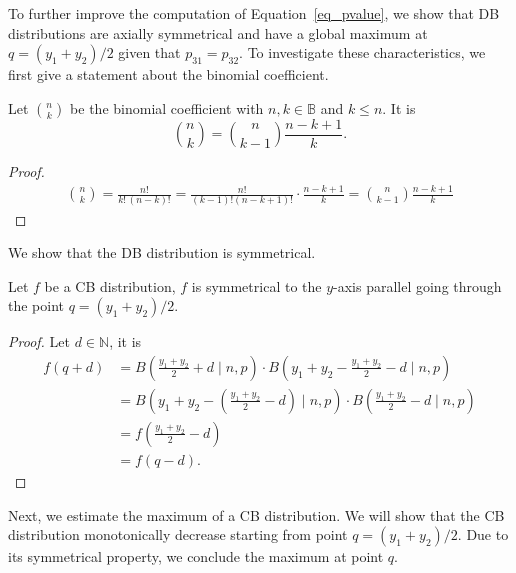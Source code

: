 \noindent
To further improve the computation of Equation~\ref{eq_pvalue}, we show that DB distributions are axially symmetrical and have a global maximum at $q=(y_1 + y_2)/2$ given that $p_{31}=p_{32}$. 
To investigate these characteristics, we first give a statement about the binomial coefficient.

\begin{mylemma}
 Let ${n \choose k}$ be the binomial coefficient with $n, k \in \mathbb{B}$ and $k \leq n$.
 It is
 $${n \choose k} = {n \choose k-1} \frac{n-k+1}{k}.$$
\label{lemma_bin_coeff}	
\end{mylemma}
\begin{proof}
  \begin{align*}
   {n \choose k} = \frac{n!}{k!\,(n-k)!} = \frac{n!}{(k-1)!(n-k+1)!} \cdot \frac{n-k+1}{k} = {n \choose k-1} \frac{n-k+1}{k}
  \end{align*}
\end{proof}

\noindent
We show that the DB distribution is symmetrical.

\begin{mylemma}
 Let $f$ be a CB distribution, $f$ is symmetrical to the $y$-axis parallel going through the point $q = (y_1 + y_2)/2$.
\label{lemma_cb_parallel}
\end{mylemma}
\begin{proof}
 Let $d \in \mathbb{N}$, it is
 \begin{align*}
  f(q + d) &= B(\frac{y_1+y_2}{2} + d \mid n, p) \cdot B(y_1 + y_2 - \frac{y_1+y_2}{2} - d \mid n, p) \\
  &= B(y_1 + y_2 - (\frac{y_1 + y_2}{2} - d) \mid n, p) \cdot B(\frac{y_1 + y_2}{2} - d \mid n, p) \\
  &= f(\frac{y_1 + y_2}{2} - d)\\
  &= f(q-d).
 \end{align*}
\end{proof}

\noindent
Next, we estimate the maximum of a CB distribution.
We will show that the CB distribution monotonically decrease starting from point $q = (y_1 + y_2)/2$.
Due to its symmetrical property, we conclude the maximum at point $q$.

